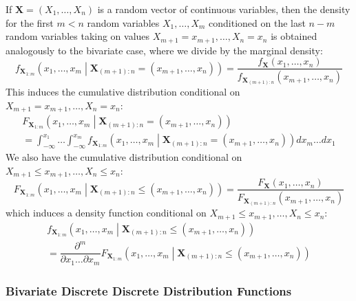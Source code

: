 \documentclass[11pt]{report} %
\begin{document}
If $\mathbf{X} = \left(X_{1}, \dots, X_{n}\right)$ is a random vector of continuous variables, then the density for the first $m < n$ random variables $X_{1}, \dots, X_{m}$ conditioned on the last $n - m$ random variables taking on values $X_{m + 1} = x_{m + 1}, \dots , X_{n} = x_{n}$ is obtained analogously to the bivariate case, where we divide by the marginal density:
\begin{equation}
f_{\mathbf{X}_{1:m}}\left(x_{1}, \dots, x_{m}\middle|\mathbf{X}_{\left(m + 1\right):n} = \left(x_{m + 1}, \dots, x_{n}\right)\right) = \dfrac{f_{\mathbf{X}}\left(x_{1}, \dots, x_{n}\right)}{f_{\mathbf{X}_{\left(m + 1\right):n}}\left(x_{m + 1}, \dots, x_{n}\right)}
\end{equation}
This induces the cumulative distribution conditional on $X_{m + 1} = x_{m + 1}, \dots , X_{n} = x_{n}$:
\begin{multline}
F_{\mathbf{X}_{1:m}}\left(x_{1}, \dots, x_{m}\middle|\mathbf{X}_{\left(m + 1\right):n} = \left(x_{m + 1}, \dots, x_{n}\right)\right) \\
= \int_{-\infty}^{x_{1}}\dots\int_{-\infty}^{x_{m}}f_{\mathbf{X}_{1:m}}\left(x_{1}, \dots, x_{m}\middle|\mathbf{X}_{\left(m + 1\right):n} = \left(x_{m + 1}, \dots, x_{n}\right)\right)dx_{m}\dots dx_{1}
\end{multline}
We also have the cumulative distribution conditional on $X_{m + 1} \leq x_{m + 1}, \dots , X_{n} \leq x_{n}$:
\begin{equation}
F_{\mathbf{X}_{1:m}}\left(x_{1}, \dots, x_{m}\middle|\mathbf{X}_{\left(m + 1\right):n} \leq \left(x_{m + 1}, \dots, x_{n}\right)\right) = \dfrac{F_{\mathbf{X}}\left(x_{1}, \dots, x_{n}\right)}{F_{\mathbf{X}_{\left(m + 1\right):n}}\left(x_{m + 1}, \dots, x_{n}\right)}
\end{equation}
which induces a density function conditional on $X_{m + 1} \leq x_{m + 1}, \dots , X_{n} \leq x_{n}$:
\begin{multline}
f_{\mathbf{X}_{1:m}}\left(x_{1}, \dots, x_{m}\middle|\mathbf{X}_{\left(m + 1\right):n} \leq \left(x_{m + 1}, \dots, x_{n}\right)\right) \\
= \dfrac{\partial^{m}}{\partial x_{1}\dots\partial x_{m}}F_{\mathbf{X}_{1:m}}\left(x_{1}, \dots, x_{m}\middle|\mathbf{X}_{\left(m + 1\right):n} \leq \left(x_{m + 1}, \dots, x_{n}\right)\right)
\end{multline}

\subsubsection{Bivariate Discrete Discrete Distribution Functions}
\end{document}
